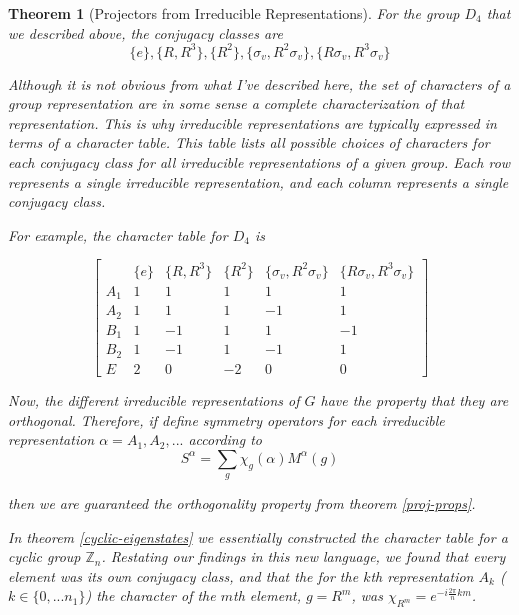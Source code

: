 \documentclass{article}
\newtheorem{theorem}{Theorem}[section]
\theoremstyle{definition}
\begin{document}
\begin{theorem}[Projectors from Irreducible Representations]
For the group $D_4$ that we described above, the conjugacy classes are 
\begin{equation}
\{e\}, \{R, R^3\},\{R^2\}, \{\sigma_v, R^2 \sigma_v\}, \{R \sigma_v, R^3 \sigma_v\}
\end{equation}

Although it is not obvious from what I've described here, the set of characters of a group representation are in some sense a complete characterization of that representation. This is why irreducible representations are typically expressed in terms of a \emph{character table}. This table lists all possible choices of characters for each conjugacy class for all irreducible representations of a given group. Each row represents a single irreducible representation, and each column represents a single conjugacy class. 

For example, the character table for $D_4$ is 

\begin{equation}
\begin{bmatrix}
& \{e\} & \{R, R^3\} & \{R^2\} & \{\sigma_v, R^2 \sigma_v\} & \{R \sigma_v, R^3 \sigma_v\}\\
A_1 & 1 & 1 & 1 & 1 & 1\\
A_2 & 1 & 1 &1 & -1 & 1\\
B_1 & 1 & -1 & 1 & 1 & -1\\
B_2 & 1 & -1 & 1 & -1 & 1\\
E & 2 & 0 & - 2 & 0 & 0
\end{bmatrix}
\end{equation}

Now, the different irreducible representations of $G$ have the property that they are orthogonal. Therefore, if define symmetry operators for each irreducible representation $\alpha = A_1, A_2, ...$ according to
\begin{equation}
S^{\alpha} = \sum_g \chi_g(\alpha) M^\alpha(g)
\end{equation}

then we are guaranteed the orthogonality property from theorem \ref{proj-props}.

In theorem \ref{cyclic-eigenstates} we essentially constructed the character table for a cyclic group $\mathbb{Z}_n$. Restating our findings in this new language, we found that every element was its own conjugacy class, and that the for the $k$th representation $A_k$ ($k \in \{0,...n_1\}$) the character of the $m$th element, $g = R^m$, was $\chi_{R^m} = e^{-i \frac{2\pi}{n} km}$.


\end{theorem}
\end{document}

